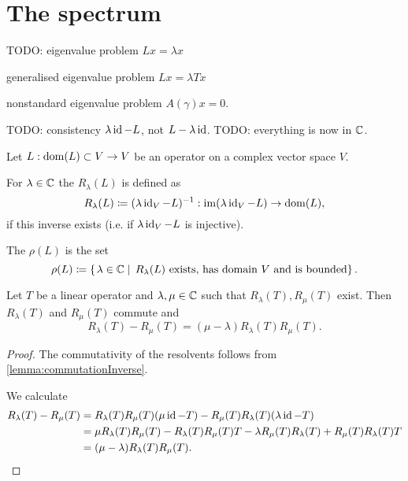 \section{The spectrum}
TODO: eigenvalue problem $Lx = \lambda x$

generalised eigenvalue problem $Lx = \lambda T x$

nonstandard eigenvalue problem $A(\gamma)x = 0$.

TODO: consistency $\lambda \operatorname{id} - L$, not $L-\lambda \operatorname{id}$.
TODO: everything is now in $\mathbb{C}$.

\begin{definition}
Let $L: \operatorname{dom}(L)\subset V \to V$ be an operator on a complex vector space $V$.

For $\lambda\in\mathbb{C}$ the  $R_\lambda(L)$ is defined as
\[ R_\lambda(L) \coloneqq (\lambda \operatorname{id}_V - L)^{-1}: \operatorname{im}(\lambda \operatorname{id}_V - L)\to\operatorname{dom}(L), \]
if this inverse exists (i.e. if $\lambda \operatorname{id}_V - L$ is injective).

The  $\rho(L)$ is the set
\[ \rho(L) \coloneqq \left\{\left. \lambda\in \mathbb{C} \;\right|\; \text{$R_\lambda(L)$ exists, has domain $V$ and is bounded} \right\}. \]
\end{definition}

\begin{lemma}
Let $T$ be a linear operator and $\lambda,\mu\in\mathbb{C}$ such that $R_\lambda(T), R_\mu(T)$ exist. Then $R_\lambda(T)$ and $R_\mu(T)$ commute and
\[ R_\lambda(T) - R_\mu(T) = (\mu-\lambda)R_\lambda(T)R_\mu(T). \]
\end{lemma}
\begin{proof}
The commutativity of the resolvents follows from \ref{lemma:commutationInverse}.

We calculate
\begin{align*}
R_\lambda(T) - R_\mu(T) &= R_\lambda(T)R_\mu(T)(\mu\operatorname{id} - T) - R_\mu(T)R_\lambda(T)(\lambda\operatorname{id} - T) \\
&= \mu R_\lambda(T)R_\mu(T) - R_\lambda(T)R_\mu(T) T - \lambda R_\mu(T)R_\lambda(T) + R_\mu(T)R_\lambda(T) T \\
&= (\mu - \lambda)R_\lambda(T)R_\mu(T).
\end{align*}
\end{proof}

